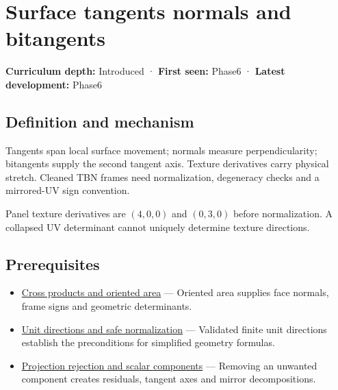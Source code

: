 \hypertarget{appendix-e31893dec985}{}\label{referencestart:appendix-e31893dec985}
\section{Surface tangents normals and bitangents}\label{appendix-e31893dec985-surface-tangents-normals-and-bitangents}

\textbf{Curriculum depth:} Introduced · \textbf{First seen:} Phase6 · \textbf{Latest development:} Phase6

\begin{allmightroledefinition}

\subsection{Definition and mechanism}\label{appendix-e31893dec985-definition-and-mechanism}

Tangents span local surface movement; normals measure perpendicularity; bitangents supply the second tangent axis. Texture derivatives carry physical stretch. Cleaned TBN frames need normalization, degeneracy checks and a mirrored-UV sign convention.

\end{allmightroledefinition}

Panel texture derivatives are \((4,0,0)\) and \((0,3,0)\) before normalization. A collapsed UV determinant cannot uniquely determine texture directions.

\subsection{Prerequisites}\label{appendix-e31893dec985-prerequisites}

\begin{itemize}
\tightlist
\item
  \hyperref[appendix-2391db8052b1]{Cross products and oriented area} --- Oriented area supplies face normals, frame signs and geometric determinants.
\item
  \hyperref[appendix-f744e41b95b4]{Unit directions and safe normalization} --- Validated finite unit directions establish the preconditions for simplified geometry formulas.
\item
  \hyperref[appendix-505a502c372a]{Projection rejection and scalar components} --- Removing an unwanted component creates residuals, tangent axes and mirror decompositions.
\end{itemize}

